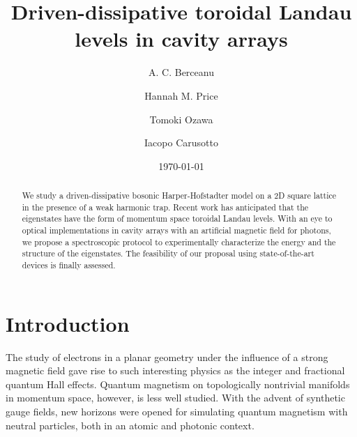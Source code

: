 \documentclass[twocolumn, 10pt, aps, superscriptaddress, floatfix, showpacs, pra, citeautoscript]{revtex4-1}
\newcommand{\co}[2]{#2}
\renewcommand{\paragraph}{\co}
\begin{document}
\title{Driven-dissipative toroidal Landau levels in cavity arrays}


\author{A. C. Berceanu}
\author{Hannah M. Price}
\author{Tomoki Ozawa}
\author{Iacopo Carusotto}

\date{\today}

\begin{abstract}
  We study a driven-dissipative bosonic Harper-Hofstadter model on a
  2D square lattice in the presence of a weak harmonic trap. Recent
  work has anticipated that the eigenstates have the form of momentum
  space toroidal Landau levels. With an eye to optical implementations
  in cavity arrays with an artificial magnetic field for photons, we
  propose a spectroscopic protocol to experimentally characterize the
  energy and the structure of the eigenstates. The feasibility of our
  proposal using state-of-the-art devices is finally assessed.
\end{abstract}

\maketitle


\section{Introduction}

\paragraph{Quantum magnetism is interesting, even more so in momentum space.}
The study of electrons in a planar geometry under the influence of a
strong magnetic field gave rise to such interesting physics as the
integer and fractional quantum Hall effects. Quantum magnetism on
topologically nontrivial manifolds in momentum space, however, is less
well studied.  With the advent of synthetic gauge fields, new horizons
were opened for simulating quantum magnetism with neutral particles,
both in an atomic and photonic context.
\end{document}
